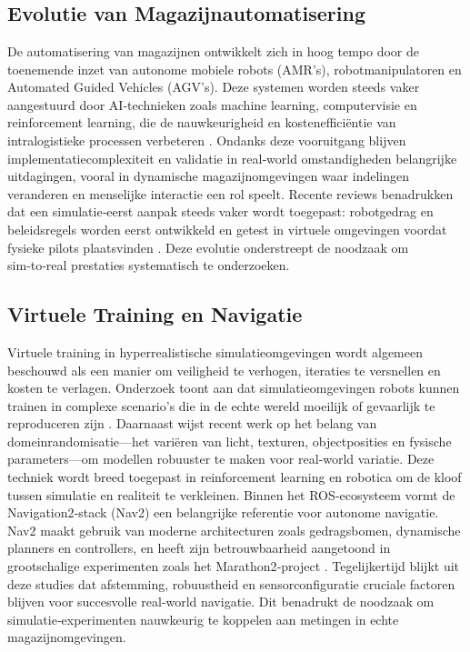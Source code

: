 \chapter{}%
\label{ch:stand-van-zaken}

\section{Evolutie van Magazijnautomatisering}
De automatisering van magazijnen ontwikkelt zich in hoog tempo door de toenemende inzet van autonome mobiele robots (AMR’s), robotmanipulatoren en Automated Guided Vehicles (AGV’s). Deze systemen worden steeds vaker aangestuurd door AI‑technieken zoals machine learning, computervisie en reinforcement learning, die de nauwkeurigheid en kostenefficiëntie van intralogistieke processen verbeteren \autocite{Sodiya2024}. Ondanks deze vooruitgang blijven implementatiecomplexiteit en validatie in real‑world omstandigheden belangrijke uitdagingen, vooral in dynamische magazijnomgevingen waar indelingen veranderen en menselijke interactie een rol speelt. Recente reviews benadrukken dat een simulatie‑eerst aanpak steeds vaker wordt toegepast: robotgedrag en beleidsregels worden eerst ontwikkeld en getest in virtuele omgevingen voordat fysieke pilots plaatsvinden \autocite{Keith2024}. Deze evolutie onderstreept de noodzaak om sim‑to‑real prestaties systematisch te onderzoeken.

\section{Virtuele Training en Navigatie}
Virtuele training in hyperrealistische simulatieomgevingen wordt algemeen beschouwd als een manier om veiligheid te verhogen, iteraties te versnellen en kosten te verlagen. Onderzoek toont aan dat simulatieomgevingen robots kunnen trainen in complexe scenario’s die in de echte wereld moeilijk of gevaarlijk te reproduceren zijn \textcite{Fareed2024}. Daarnaast wijst recent werk op het belang van domeinrandomisatie—het variëren van licht, texturen, objectposities en fysische parameters—om modellen robuuster te maken voor real‑world variatie. Deze techniek wordt breed toegepast in reinforcement learning en robotica om de kloof tussen simulatie en realiteit te verkleinen. Binnen het ROS‑ecosysteem vormt de Navigation2‑stack (Nav2) een belangrijke referentie voor autonome navigatie. Nav2 maakt gebruik van moderne architecturen zoals gedragsbomen, dynamische planners en controllers, en heeft zijn betrouwbaarheid aangetoond in grootschalige experimenten zoals het Marathon2‑project \textcite{Macenski2020}. Tegelijkertijd blijkt uit deze studies dat afstemming, robuustheid en sensorconfiguratie cruciale factoren blijven voor succesvolle real‑world navigatie. Dit benadrukt de noodzaak om simulatie‑experimenten nauwkeurig te koppelen aan metingen in echte magazijnomgevingen.

